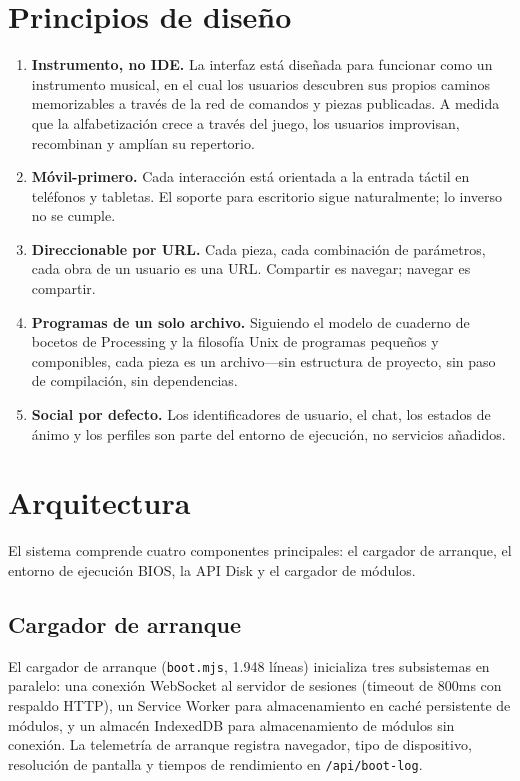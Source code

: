 \documentclass[10pt,letterpaper,twocolumn]{article}
\begin{document}

\section{Principios de diseño}
\label{sec:principles}

\begin{enumerate}
  \item \textbf{Instrumento, no IDE.} La interfaz está diseñada para funcionar como un instrumento musical, en el cual los usuarios descubren sus propios caminos memorizables a través de la red de comandos y piezas publicadas. A medida que la alfabetización crece a través del juego, los usuarios improvisan, recombinan y amplían su repertorio.
  \item \textbf{Móvil-primero.} Cada interacción está orientada a la entrada táctil en teléfonos y tabletas. El soporte para escritorio sigue naturalmente; lo inverso no se cumple.
  \item \textbf{Direccionable por URL.} Cada pieza, cada combinación de parámetros, cada obra de un usuario es una URL. Compartir es navegar; navegar es compartir.
  \item \textbf{Programas de un solo archivo.} Siguiendo el modelo de cuaderno de bocetos de Processing y la filosofía Unix de programas pequeños y componibles, cada pieza es un archivo---sin estructura de proyecto, sin paso de compilación, sin dependencias.
  \item \textbf{Social por defecto.} Los identificadores de usuario, el chat, los estados de ánimo y los perfiles son parte del entorno de ejecución, no servicios añadidos.
\end{enumerate}


\section{Arquitectura}
\label{sec:architecture}

El sistema comprende cuatro componentes principales: el cargador de arranque, el entorno de ejecución BIOS, la API Disk y el cargador de módulos.

\subsection{Cargador de arranque}

El cargador de arranque (\texttt{boot.mjs}, 1.948 líneas) inicializa tres subsistemas en paralelo: una conexión WebSocket al servidor de sesiones (timeout de 800ms con respaldo HTTP), un Service Worker para almacenamiento en caché persistente de módulos, y un almacén IndexedDB para almacenamiento de módulos sin conexión. La telemetría de arranque registra navegador, tipo de dispositivo, resolución de pantalla y tiempos de rendimiento en \texttt{/api/boot-log}.
\end{document}
